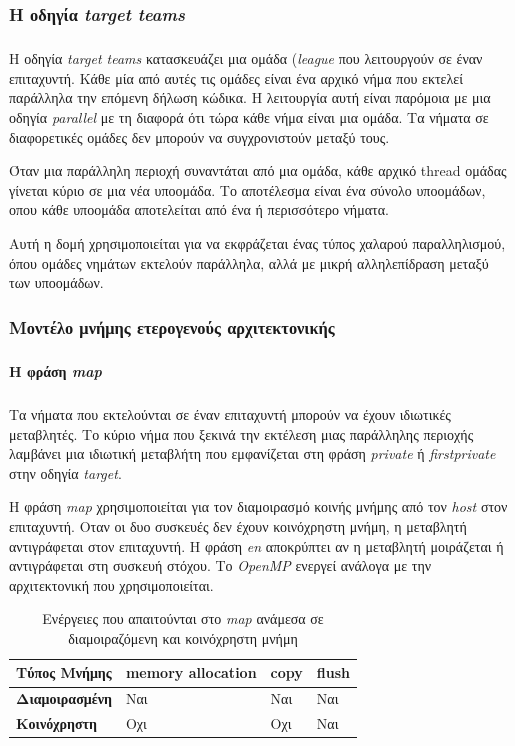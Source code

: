 \documentclass[12pt]{article}
\newcommand{\en}[1]{\foreignlanguage{english}{#1}}
\begin{document}
\subsubsection{H οδηγία \emph{\en{target teams}}}
\subparagraph{}
Η οδηγία \emph{\en{target teams}} κατασκευάζει μια ομάδα (\emph{\en{league}} που λειτουργούν σε έναν επιταχυντή. Κάθε μία από αυτές τις ομάδες είναι ένα αρχικό νήμα που εκτελεί παράλληλα την επόμενη δήλωση κώδικα. Η λειτουργία αυτή είναι παρόμοια με μια οδηγία \emph{\en{parallel}} με τη διαφορά ότι τώρα κάθε νήμα είναι μια ομάδα. Τα νήματα σε διαφορετικές ομάδες δεν μπορούν να συγχρονιστούν μεταξύ τους.

Όταν μια παράλληλη περιοχή συναντάται από μια ομάδα, κάθε αρχικό thread ομάδας γίνεται κύριο σε μια νέα υποομάδα. Το αποτέλεσμα είναι ένα σύνολο υποομάδων, οπου κάθε υποομάδα αποτελείται από ένα ή περισσότερο νήματα.

Αυτή η δομή χρησιμοποιείται για να εκφράζεται ένας τύπος χαλαρού παραλληλισμού, όπου ομάδες νημάτων εκτελούν παράλληλα, αλλά με μικρή αλληλεπίδραση μεταξύ των υποομάδων.


\subsubsection{Μοντέλο μνήμης ετερογενούς αρχιτεκτονικής}
\subparagraph{}

\paragraph{Η φράση \emph{\en{map}}}
\subparagraph{}
Τα νήματα που εκτελούνται σε έναν επιταχυντή μπορούν να έχουν ιδιωτικές μεταβλητές. Το κύριο νήμα που ξεκινά την εκτέλεση μιας παράλληλης περιοχής λαμβάνει μια ιδιωτική μεταβλήτη που εμφανίζεται στη φράση \emph{\en{private}} ή \emph{\en{firstprivate}} στην οδηγία \emph{\en{target}}.

Η φράση \emph{\en{map}} χρησιμοποιείται για τον διαμοιρασμό κοινής μνήμης από τον \emph{\en{host}} στον επιταχυντή. Οταν οι δυο συσκευές δεν έχουν κοινόχρηστη μνήμη, η μεταβλητή αντιγράφεται στον επιταχυντή. Η φράση \emph{\en{en}} αποκρύπτει αν η μεταβλητή μοιράζεται ή αντιγράφεται στη συσκευή στόχου. Το \emph{\en{OpenMP}} ενεργεί ανάλογα με την αρχιτεκτονική που χρησιμοποιείται.
\\

\begin{table}[htbp]
\captionsetup{justification=raggedright,
singlelinecheck=false
}
\caption{Ενέργειες που απαιτούνται στο \en{\emph{map}} ανάμεσα σε διαμοιραζόμενη και κοινόχρηστη μνήμη}
\def\arraystretch{1.5}
\begin{tabular}{| p{} | p{}|  p{} |  p{}|}
 Τύπος Μνήμης\cellcolor[HTML]{D0D0D0} & \textbf{\en{memory allocation}} \cellcolor[HTML]{D0D0D0} & \textbf{\en{copy}}\cellcolor[HTML]{D0D0D0} & \textbf{\en{flush}} \cellcolor[HTML]{D0D0D0} \\
\hline
\textbf{Διαμοιρασμένη} & Ναι & Ναι & Ναι \\
\hline
\textbf{Κοινόχρηστη} & Οχι & Οχι & Ναι \\
\hline
\end{tabular}
\end{table}
\end{document}

